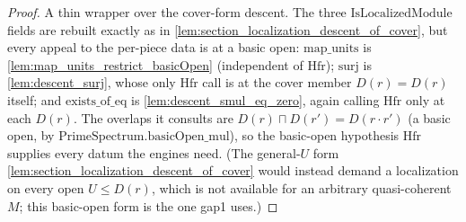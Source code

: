 \begin{proof}
  A thin wrapper over the cover-form descent. The three \(\mathrm{IsLocalizedModule}\) fields are rebuilt
  exactly as in \cref{lem:section_localization_descent_of_cover}, but every appeal to the per-piece data
  is at a basic open: \(\mathrm{map\_units}\) is \cref{lem:map_units_restrict_basicOpen} (independent of
  \(\mathrm{Hfr}\)); \(\mathrm{surj}\) is \cref{lem:descent_surj}, whose only \(\mathrm{Hfr}\) call is at
  the cover member \(D(r) = D(r)\) itself; and \(\mathrm{exists\_of\_eq}\) is
  \cref{lem:descent_smul_eq_zero}, again calling \(\mathrm{Hfr}\) only at each \(D(r)\). The overlaps it
  consults are \(D(r) \sqcap D(r') = D(r\cdot r')\) (a basic open, by
  \(\mathrm{PrimeSpectrum.basicOpen\_mul}\)), so the basic-open hypothesis \(\mathrm{Hfr}\) supplies every
  datum the engines need. (The general-\(U\) form
  \cref{lem:section_localization_descent_of_cover} would instead demand a localization on every open
  \(U \le D(r)\), which is not available for an arbitrary quasi-coherent \(M\); this basic-open form is
  the one gap1 uses.)
\end{proof}


